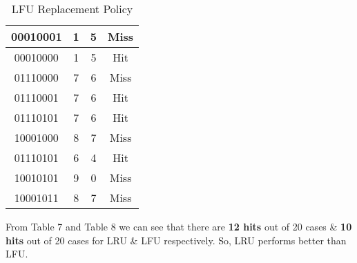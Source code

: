 \documentclass[12pt]{article}
\begin{document}
\begin{table}
\begin{tabular}{|c|c|c|c|}
\hline
00010001                                                                     & 1                  & 5                      & Miss                \\ 
\hline
00010000                                                                     & 1                  & 5                      & Hit                 \\ 
\hline
01110000                                                                     & 7                  & 6                      & Miss                \\ 
\hline
01110001                                                                     & 7                  & 6                      & Hit                 \\ 
\hline
01110101                                                                     & 7                  & 6                      & Hit                 \\ 
\hline
10001000                                                                     & 8                  & 7                      & Miss                \\ 
\hline
01110101                                                                     & 6                  & 4                      & Hit                 \\ 
\hline
10010101                                                                     & 9                  & 0                      & Miss                \\ 
\hline
10001011                                                                     & 8                  & 7                      & Miss                \\
\hline
\end{tabular}
\caption{LFU Replacement Policy}
\end{table}

From Table 7 and Table 8 we can see that there are \textbf{12 hits} out of 20 cases \& \textbf{10 hits} out of 20 cases for LRU \& LFU respectively. So, LRU performs better than LFU.
\end{document}
